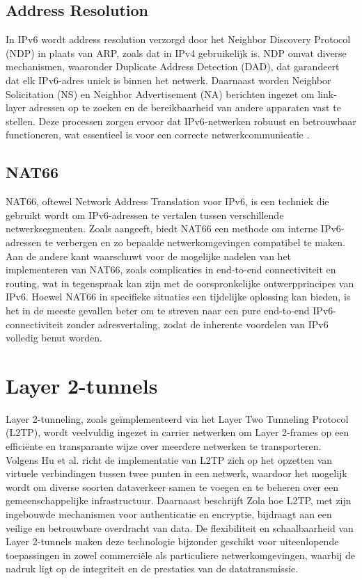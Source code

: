   \subsection{Address Resolution}
  In IPv6 wordt address resolution verzorgd door het Neighbor Discovery Protocol (NDP) in plaats van ARP, zoals dat in IPv4 gebruikelijk is. 
  NDP omvat diverse mechanismen, waaronder Duplicate Address Detection (DAD), dat garandeert dat elk IPv6-adres uniek is binnen het netwerk. 
  Daarnaast worden Neighbor Solicitation (NS) en Neighbor Advertisement (NA) berichten ingezet om link-layer adressen op te zoeken en de bereikbaarheid van andere apparaten vast te stellen. 
  Deze processen zorgen ervoor dat IPv6-netwerken robuust en betrouwbaar functioneren, wat essentieel is voor een correcte netwerkcommunicatie \textcite{NSA2023}.

  \subsection{NAT66}

  NAT66, oftewel Network Address Translation voor IPv6, is een techniek die gebruikt wordt om IPv6-adressen te vertalen tussen verschillende netwerksegmenten. 
  Zoals \textcite{Cilloni2018} aangeeft, biedt NAT66 een methode om interne IPv6-adressen te verbergen en zo bepaalde netwerkomgevingen compatibel te maken. 
  Aan de andere kant waarschuwt \textcite{Coffeen2016} voor de mogelijke nadelen van het implementeren van NAT66, zoals complicaties in end-to-end connectiviteit en routing, 
  wat in tegenspraak kan zijn met de oorspronkelijke ontwerpprincipes van IPv6. Hoewel NAT66 in specifieke situaties een tijdelijke oplossing kan bieden, 
  is het in de meeste gevallen beter om te streven naar een pure end-to-end IPv6-connectiviteit zonder adresvertaling, zodat de inherente voordelen van IPv6 volledig benut worden.


  \section{Layer 2-tunnels}
  \label{sec:layer 2-tunnels}

  Layer 2-tunneling, zoals geïmplementeerd via het Layer Two Tunneling Protocol (L2TP), wordt veelvuldig ingezet in carrier netwerken om Layer 2-frames op een efficiënte en transparante wijze over meerdere netwerken te transporteren. 
  Volgens Hu et al. \textcite{Hu2011} richt de implementatie van L2TP zich op het opzetten van virtuele verbindingen tussen twee punten in een netwerk, 
  waardoor het mogelijk wordt om diverse soorten dataverkeer samen te voegen en te beheren over een gemeenschappelijke infrastructuur. 
  Daarnaast beschrijft Zola \textcite{Zola2021} hoe L2TP, met zijn ingebouwde mechanismen voor authenticatie en encryptie, bijdraagt aan een veilige en betrouwbare overdracht van data. 
  De flexibiliteit en schaalbaarheid van Layer 2-tunnels maken deze technologie bijzonder geschikt voor uiteenlopende toepassingen in zowel commerciële als particuliere netwerkomgevingen, 
  waarbij de nadruk ligt op de integriteit en de prestaties van de datatransmissie.
  

